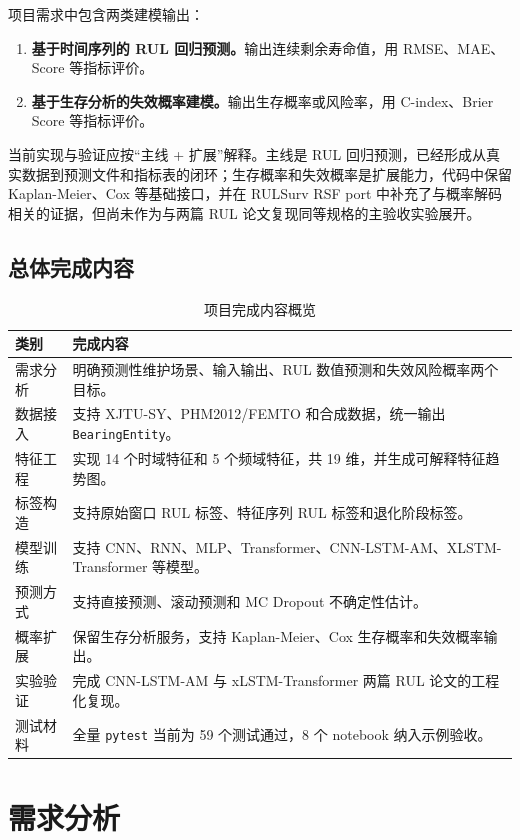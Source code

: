 \documentclass[UTF8,a4paper,12pt]{ctexart}
\newcommand{\code}[1]{\texttt{#1}}
\begin{document}
项目需求中包含两类建模输出：

\begin{enumerate}
  \item \textbf{基于时间序列的 RUL 回归预测。}输出连续剩余寿命值，用 RMSE、MAE、Score 等指标评价。
  \item \textbf{基于生存分析的失效概率建模。}输出生存概率或风险率，用 C-index、Brier Score 等指标评价。
\end{enumerate}

当前实现与验证应按“主线 + 扩展”解释。主线是 RUL 回归预测，已经形成从真实数据到预测文件和指标表的闭环；生存概率和失效概率是扩展能力，代码中保留 Kaplan-Meier、Cox 等基础接口，并在 RULSurv RSF port 中补充了与概率解码相关的证据，但尚未作为与两篇 RUL 论文复现同等规格的主验收实验展开。

\subsection{总体完成内容}

\begin{table}[H]
\centering
\caption{项目完成内容概览}
\begin{tabularx}{\textwidth}{p{3.0cm}Y}
\toprule
类别 & 完成内容 \\
\midrule
需求分析 & 明确预测性维护场景、输入输出、RUL 数值预测和失效风险概率两个目标。 \\
数据接入 & 支持 XJTU-SY、PHM2012/FEMTO 和合成数据，统一输出 \code{BearingEntity}。 \\
特征工程 & 实现 14 个时域特征和 5 个频域特征，共 19 维，并生成可解释特征趋势图。 \\
标签构造 & 支持原始窗口 RUL 标签、特征序列 RUL 标签和退化阶段标签。 \\
模型训练 & 支持 CNN、RNN、MLP、Transformer、CNN-LSTM-AM、XLSTM-Transformer 等模型。 \\
预测方式 & 支持直接预测、滚动预测和 MC Dropout 不确定性估计。 \\
概率扩展 & 保留生存分析服务，支持 Kaplan-Meier、Cox 生存概率和失效概率输出。 \\
实验验证 & 完成 CNN-LSTM-AM 与 xLSTM-Transformer 两篇 RUL 论文的工程化复现。 \\
测试材料 & 全量 \code{pytest} 当前为 59 个测试通过，8 个 notebook 纳入示例验收。 \\
\bottomrule
\end{tabularx}
\end{table}

\section{需求分析}
\end{document}
